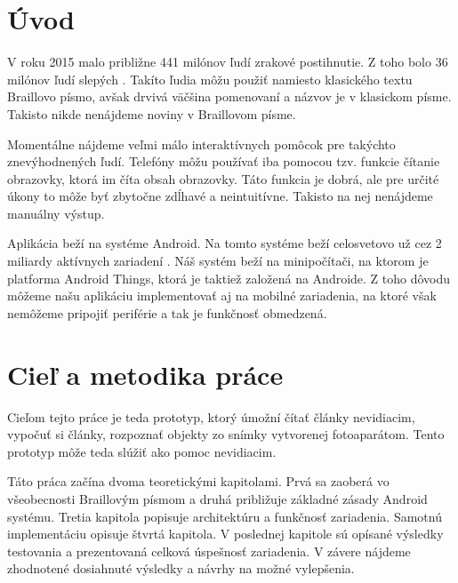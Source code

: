 \documentclass{template/socthesis}
\author{Juraj Kulich}
\begin{document}
	
\maketitle
{}

\tableofcontents

\chapter*{Úvod}
V roku 2015 malo približne 441 milónov ľudí zrakové postihnutie. Z toho bolo 36 milónov ľudí slepých \cite{bourne2017magnitude}. Takíto ľudia môžu použiť namiesto klasického textu Braillovo písmo, avšak drvivá väčšina pomenovaní a názvov je v klasickom písme. Takisto nikde nenájdeme noviny v Braillovom písme.

Momentálne nájdeme veľmi málo interaktívnych pomôcok pre takýchto znevýhodnených ľudí. Telefóny môžu používať iba pomocou tzv. funkcie čítanie obrazovky, ktorá im číta obsah obrazovky. Táto funkcia je dobrá, ale pre určité úkony to môže byť zbytočne zdĺhavé a neintuitívne. Takisto na nej nenájdeme manuálny výstup. 


Aplikácia beží na systéme Android. Na tomto systéme beží celosvetovo už cez 2 miliardy aktívnych zariadení \cite{ng_2017}. Náš systém beží na minipočítači, na ktorom je platforma Android Things, ktorá je taktiež založená na Androide. Z toho dôvodu môžeme našu aplikáciu implementovať aj na mobilné zariadenia, na ktoré však nemôžeme pripojiť periférie a tak je funkčnosť obmedzená.
\newpage

\chapter*{Cieľ a metodika práce}
Cieľom tejto práce je teda prototyp, ktorý úmožní čítať články nevidiacim, vypočuť si články, rozpoznať objekty zo snímky vytvorenej fotoaparátom. Tento prototyp môže teda slúžiť ako pomoc nevidiacim.

Táto práca začína dvoma teoretickými kapitolami. Prvá sa zaoberá vo všeobecnosti Braillovým písmom a druhá približuje základné zásady Android systému. Tretia kapitola popisuje architektúru a funkčnosť zariadenia. Samotnú implementáciu opisuje štvrtá kapitola. V poslednej kapitole sú opísané výsledky testovania a prezentovaná celková úspešnosť zariadenia. V závere nájdeme zhodnotené dosiahnuté výsledky a návrhy na možné vylepšenia. 
\newpage
\end{document}
